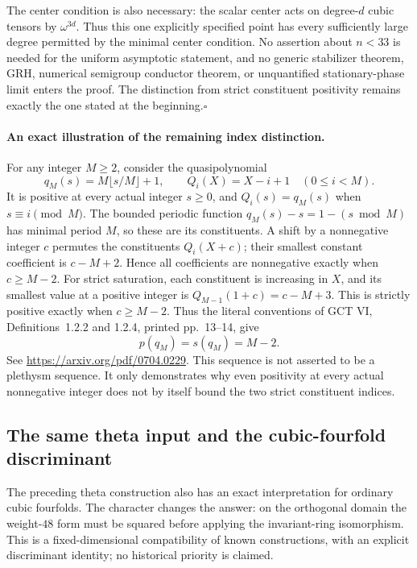 \documentclass[11pt,a4paper]{article}
\begin{document}
The center condition is also necessary: the scalar center
acts on degree-$d$ cubic tensors by $\omega^{3d}$.
Thus this one explicitly specified point has every
sufficiently large degree permitted by the minimal center
condition. No assertion about $n<33$ is needed for the
uniform asymptotic statement, and no generic stabilizer
theorem, GRH, numerical semigroup conductor theorem, or
unquantified stationary-phase limit enters the proof.
The distinction from strict constituent positivity remains
exactly the one stated at the beginning.\hfill$\square$

\paragraph{An exact illustration of the remaining index distinction.}
For any integer $M\ge2$, consider the quasipolynomial
\[
 q_M(s)=M\lfloor s/M\rfloor+1,
 \qquad Q_i(X)=X-i+1\quad(0\le i<M).                       \tag{P-F54t}
\]
It is positive at every actual integer $s\ge0$, and
$Q_i(s)=q_M(s)$ when $s\equiv i\pmod M$.
The bounded periodic function $q_M(s)-s=1-(s\bmod M)$
has minimal period $M$, so these are its constituents.
A shift by a nonnegative integer $c$ permutes the
constituents $Q_i(X+c)$; their smallest constant
coefficient is $c-M+2$. Hence all coefficients are
nonnegative exactly when $c\ge M-2$.
For strict saturation, each constituent is increasing
in $X$, and its smallest value at a positive integer
is $Q_{M-1}(1+c)=c-M+3$. This is strictly positive
exactly when $c\ge M-2$. Thus the literal conventions
of GCT VI, Definitions~1.2.2 and 1.2.4, printed
pp.~13--14, give
\[
                   p(q_M)=s(q_M)=M-2.                    \tag{P-F54u}
\]
See \url{https://arxiv.org/pdf/0704.0229}.
This sequence is not asserted to be a plethysm sequence.
It only demonstrates why even positivity at every actual
nonnegative integer does not by itself bound the two
strict constituent indices.


\subsection{The same theta input and the cubic-fourfold discriminant}

The preceding theta construction also has an exact interpretation for
ordinary cubic fourfolds. The character changes the answer: on the
orthogonal domain the weight-$48$ form must be squared before applying
the invariant-ring isomorphism. This is a fixed-dimensional
compatibility of known constructions, with an explicit discriminant
identity; no historical priority is claimed.
\end{document}
